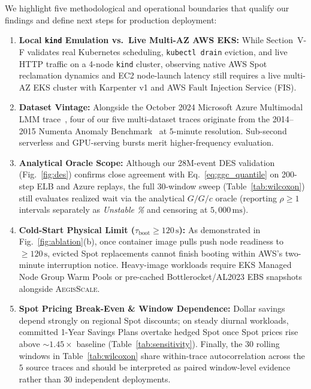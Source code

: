\documentclass[journal]{IEEEtran}
\begin{document}
We highlight five methodological and operational boundaries that qualify our findings and define next steps for production deployment:
\begin{enumerate}
    \item \textbf{Local \texttt{kind} Emulation vs.\ Live Multi-AZ AWS EKS:} While Section~V-F validates real Kubernetes scheduling, \texttt{kubectl drain} eviction, and live HTTP traffic on a 4-node \texttt{kind} cluster, observing native AWS Spot reclamation dynamics and EC2 node-launch latency still requires a live multi-AZ EKS cluster with Karpenter v1 and AWS Fault Injection Service (FIS).
    \item \textbf{Dataset Vintage:} Alongside the October 2024 Microsoft Azure Multimodal LMM trace~\cite{qiu2025modserve}, four of our five multi-dataset traces originate from the 2014--2015 Numenta Anomaly Benchmark~\cite{lavin2015evaluating} at $5$-minute resolution. Sub-second serverless and GPU-serving bursts merit higher-frequency evaluation.
    \item \textbf{Analytical Oracle Scope:} Although our 28M-event DES validation (Fig.~\ref{fig:des}) confirms close agreement with Eq.~\eqref{eq:ggc_quantile} on 200-step ELB and Azure replays, the full 30-window sweep (Table~\ref{tab:wilcoxon}) still evaluates realized wait via the analytical $G/G/c$ oracle (reporting $\rho \ge 1$ intervals separately as \emph{Unstable \%} and censoring at $5,000\,\mathrm{ms}$).
    \item \textbf{Cold-Start Physical Limit ($\tau_{\mathrm{boot}} \ge 120\,\mathrm{s}$):} As demonstrated in Fig.~\ref{fig:ablation}(b), once container image pulls push node readiness to $\ge 120\,\mathrm{s}$, evicted Spot replacements cannot finish booting within AWS's two-minute interruption notice. Heavy-image workloads require EKS Managed Node Group Warm Pools or pre-cached Bottlerocket/AL2023 EBS snapshots alongside \textsc{AegisScale}.
    \item \textbf{Spot Pricing Break-Even \& Window Dependence:} Dollar savings depend strongly on regional Spot discounts; on steady diurnal workloads, committed 1-Year Savings Plans overtake hedged Spot once Spot prices rise above $\sim 1.45\times$ baseline (Table~\ref{tab:sensitivity}). Finally, the $30$ rolling windows in Table~\ref{tab:wilcoxon} share within-trace autocorrelation across the $5$ source traces and should be interpreted as paired window-level evidence rather than $30$ independent deployments.
\end{enumerate}
\end{document}
